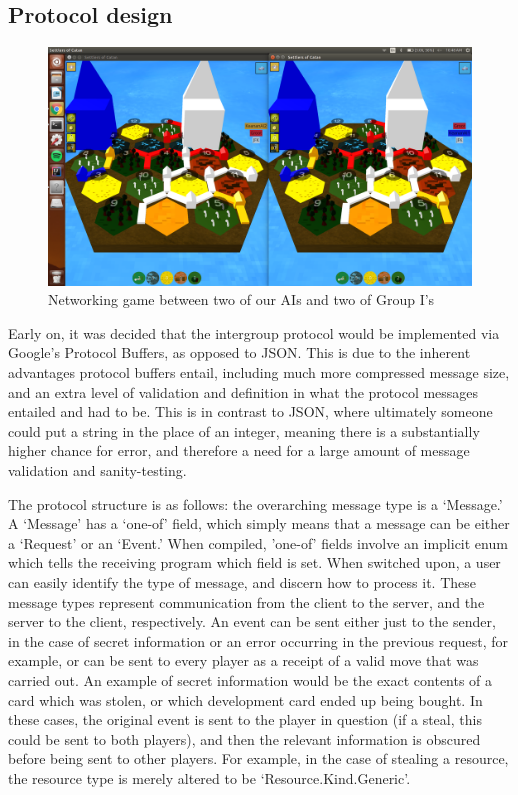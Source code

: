 \documentclass[a4paper,doc,draftfirst]{apa6}
\begin{document}
\subsection{Protocol design}
\begin{figure}[hbtp]
      \includegraphics[width=\textwidth]{finishedAIGame}
      \caption{Networking game between two of our AIs and two of Group I's}
\end{figure}
Early on, it was decided that the intergroup protocol would be implemented via Google’s Protocol Buffers, as opposed to JSON. This is due to the inherent advantages protocol buffers entail, including much more compressed message size, and an extra level of validation and definition in what the protocol messages entailed and had to be. This is in contrast to JSON, where ultimately someone could put a string in the place of an integer, meaning there is a substantially higher chance for error, and therefore a need for a large amount of message validation and sanity-testing.

The protocol structure is as follows: the overarching message type is a ‘Message.’ A ‘Message’ has a ‘one-of’ field, which simply means that a message can be either a ‘Request’ or an ‘Event.’ When compiled, 'one-of' fields involve an implicit enum which tells the receiving program which field is set. When switched upon, a user can easily identify the type of message, and discern how to process it. These message types represent communication from the client to the server, and the server to the client, respectively. An event can be sent either just to the sender, in the case of secret information or an error occurring in the previous request, for example, or can be sent to every player as a receipt of a valid move that was carried out. An example of secret information would be the exact contents of a card which was stolen, or which development card ended up being bought. In these cases, the original event is sent to the player in question (if a steal, this could be sent to both players), and then the relevant information is obscured before being sent to other players. For example, in the case of stealing a resource, the resource type is merely altered to be ‘Resource.Kind.Generic’.
\end{document}
